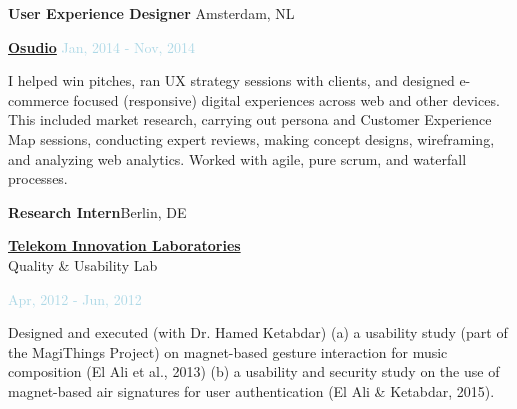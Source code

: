 \documentclass{article}
\newenvironment{outerlist}[1][\enskip\textbullet]%
        {\begin{enumerate}[#1]}{\end{enumerate}%
         \vspace{-.6\baselineskip}}
\newenvironment{innerlist}[1][\enskip\textbullet]%
        {\begin{compactenum}[#1]}{\end{compactenum}}
\begin{document}
\medskip
\medskip

\textbf{User Experience Designer}
 \hfill {Amsterdam, NL}
\begin{outerlist}

\item[] \href{http://www.osudio.com/}{\textbf{Osudio}}
 	   \hfill {\textcolor{lightblue}{Jan, 2014 - Nov, 2014}}
	   
\medskip

\begin{innerlist}[-]

\item I helped win pitches, ran UX strategy sessions with clients, and designed e-commerce focused (responsive) digital experiences across web and other devices. This included market research, carrying out persona and Customer Experience Map sessions, conducting expert reviews, making concept designs, wireframing, and analyzing web analytics. Worked with agile, pure scrum, and waterfall processes.

\end{innerlist}

\end{outerlist}



\medskip
\textbf{Research Intern}\hfill {Berlin, DE}
 
\begin{outerlist}

\item[]  \href{http://www.laboratories.telekom.com/public/English/Pages/default.aspx}{\textbf{Telekom Innovation Laboratories}}  \\ Quality \& Usability Lab 

 	   \hfill {\textcolor{lightblue}{Apr, 2012 - Jun, 2012}}
	   
	   \medskip

\begin{innerlist}[-]

\item Designed and executed (with Dr. Hamed Ketabdar) (a) a usability study (part of the MagiThings Project) on magnet-based gesture interaction for music composition (El Ali et al., 2013) (b) a usability and security study on the use of magnet-based air signatures for user authentication (El Ali \& Ketabdar, 2015).

\end{innerlist}

\end{outerlist}
\end{document}
